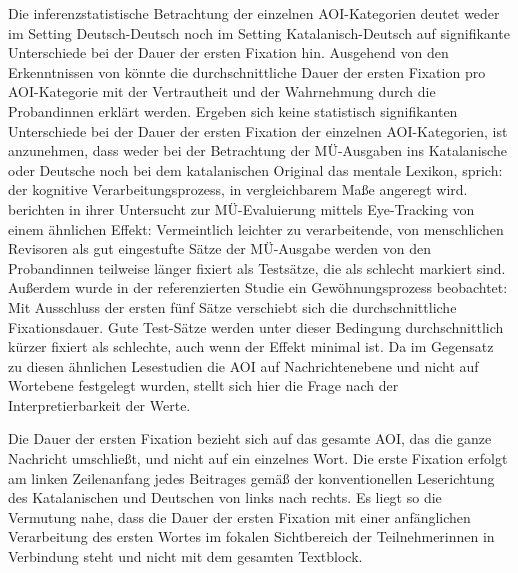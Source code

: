 Die inferenzstatistische Betrachtung der einzelnen AOI-Kategorien deutet weder im Setting Deutsch-Deutsch noch im Setting Katalanisch-Deutsch auf signifikante Unterschiede bei der Dauer der ersten Fixation hin. Ausgehend von den Erkenntnissen von \citet{jakobsen_chapter_2017} könnte die durchschnittliche Dauer der ersten Fixation pro AOI-Kategorie mit der Vertrautheit und der Wahrnehmung durch die Proband{\textperiodcentered}innen erklärt werden. Ergeben sich keine statistisch signifikanten Unterschiede bei der Dauer der ersten Fixation der einzelnen AOI-Kategorien, ist anzunehmen, dass weder bei der Betrachtung der MÜ-Ausgaben ins Katalanische oder Deutsche noch bei dem katalanischen Original das mentale Lexikon, sprich: der kognitive Verarbeitungsprozess, in vergleichbarem Maße angeregt wird. \citet[8\psq]{doherty_eye_2010} berichten in ihrer Untersucht zur MÜ-Evaluierung mittels Eye-Tracking von einem ähnlichen Effekt: Vermeintlich leichter zu verarbeitende, von menschlichen Revisoren als gut eingestufte Sätze der MÜ-Ausgabe werden von den Proband{\textperiodcentered}innen teilweise länger fixiert als Testsätze, die als schlecht markiert sind. Außerdem wurde in der referenzierten Studie ein Gewöhnungsprozess beobachtet: Mit Ausschluss der ersten fünf Sätze verschiebt sich die durchschnittliche Fixationsdauer. Gute Test-Sätze werden unter dieser Bedingung durchschnittlich kürzer fixiert als schlechte, auch wenn der Effekt minimal ist. Da im Gegensatz zu diesen ähnlichen Lesestudien die AOI auf Nachrichtenebene und nicht auf Wortebene festgelegt wurden, stellt sich hier die Frage nach der Interpretierbarkeit der Werte.

Die Dauer der ersten Fixation bezieht sich auf das gesamte AOI, das die ganze Nachricht umschließt, und nicht auf ein einzelnes Wort. Die erste Fixation erfolgt am linken Zeilenanfang jedes Beitrages gemäß der konventionellen Leserichtung des Katalanischen und Deutschen von links nach rechts. Es liegt so die Vermutung nahe, dass die Dauer der ersten Fixation mit einer anfänglichen Verarbeitung des ersten Wortes im fokalen Sichtbereich der Teilnehmer{\textperiodcentered}innen in Verbindung steht und nicht mit dem gesamten Textblock.

